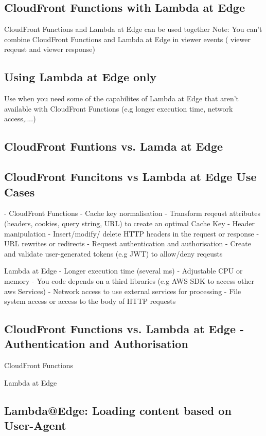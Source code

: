 \documentclass[11pt]{book}
\begin{document}
    \subsection{CloudFront Functions with Lambda at Edge}
    CloudFront Functions and Lambda at Edge can be used together
    Note: You can't combine CloudFront Functions and Lambda at Edge in viewer events ( viewer reqeust and viewer response)

    \subsection{Using Lambda at Edge only}
    Use when you need some of the capabilites of Lambda at Edge that aren't available with CloudFront Functions (e.g longer execution time, network access,....)

    \subsection{CloudFront Funtions vs. Lamda at Edge}

    \subsection{CloudFront Funcitons vs Lambda at Edge Use Cases}
    - CloudFront Functions
    - Cache key normalisation
    - Transform reqeust attributes (headers, cookies, query string, URL) to create an optimal Cache Key
    - Header manipulation
    - Insert/modify/ delete HTTP headers in the request or response
    - URL rewrites or redirects
    - Request authentication and authorisation
    - Create and validate user-generated tokens (e.g JWT) to allow/deny reqeusts

    Lambda at Edge
    - Longer execution time (several ms)
    - Adjustable CPU or memory
    - You code depends on a third libraries (e.g AWS SDK to access other aws Services)
    - Network access to use external services for processing
    - File system access or access to the body of HTTP requests

    \subsection{CloudFront Functions vs. Lambda at Edge - Authentication and Authorisation}
    CloudFront Functions

    Lambda at Edge

    \subsection{Lambda@Edge: Loading content based on User-Agent}
\end{document}
